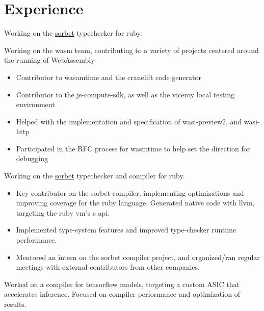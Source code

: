 \documentclass[letter,10pt]{moderncv}
\begin{document}
\makecvtitle

\section{Experience}

  {}{Working on the \href{https://sorbet.org}{sorbet} typechecker for ruby.}

  {}{Working on the wasm team, contributing to a variety of projects centered around the running of WebAssembly
  \begin{itemize}%
  \item Contributor to wasamtime and the cranelift code generator
  \item Contributor to the js-compute-sdk, as well as the viceroy local testing environment
  \item Helped with the implementation and specification of wasi-preview2, and wasi-http
  \item Participated in the RFC process for wasmtime to help set the direction for debugging
  \end{itemize}}

  {}{Working on the \href{https://sorbet.org}{sorbet} typechecker and compiler for ruby.
  \begin{itemize}%
  \item Key contributor on the sorbet compiler, implementing optimizations and
    improving coverage for the ruby language. Generated native code with llvm,
    targeting the ruby vm's c api.
  \item Implemented type-system features and improved type-checker runtime performance.
  \item Mentored an intern on the sorbet compiler project, and organized/ran
    regular meetings with external contributors from other companies.
  \end{itemize}}

  {}{Worked on a compiler for tensorflow models, targeting a custom ASIC
  that accelerates inference. Focused on compiler performance and optimization
  of results.}
\end{document}
